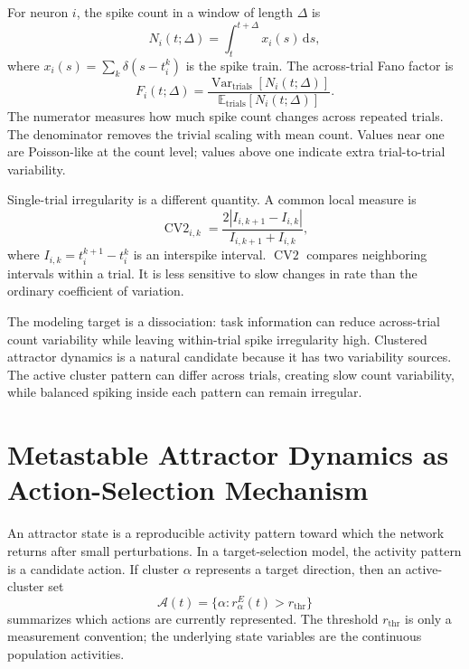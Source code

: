 For neuron $i$, the spike count in a window of length $\Delta$ is
%
\begin{equation}
  N_i(t;\Delta)
  =
  \int_t^{t+\Delta} x_i(s)\,\mathrm{d}s,
  \label{eq:spike-count-window-ch13}
\end{equation}
%
where $x_i(s)=\sum_k\delta(s-t_i^k)$ is the spike train. The across-trial Fano factor is
%
\begin{equation}
  F_i(t;\Delta)
  =
  \frac{\operatorname{Var}_{\mathrm{trials}}[N_i(t;\Delta)]}
       {\mathbb{E}_{\mathrm{trials}}[N_i(t;\Delta)]}.
  \label{eq:fano-factor-ch13}
\end{equation}
%
The numerator measures how much spike count changes across repeated trials. The denominator removes the trivial scaling with mean count. Values near one are Poisson-like at the count level; values above one indicate extra trial-to-trial variability.

Single-trial irregularity is a different quantity. A common local measure is
%
\begin{equation}
  \operatorname{CV2}_{i,k}
  =
  \frac{2|I_{i,k+1}-I_{i,k}|}{I_{i,k+1}+I_{i,k}},
  \label{eq:cv2-ch13}
\end{equation}
%
where $I_{i,k}=t_i^{k+1}-t_i^k$ is an interspike interval. $\operatorname{CV2}$ compares neighboring intervals within a trial. It is less sensitive to slow changes in rate than the ordinary coefficient of variation.

The modeling target is a dissociation: task information can reduce across-trial count variability while leaving within-trial spike irregularity high. Clustered attractor dynamics is a natural candidate because it has two variability sources. The active cluster pattern can differ across trials, creating slow count variability, while balanced spiking inside each pattern can remain irregular.

\section{Metastable Attractor Dynamics as Action-Selection Mechanism}
\label{sec:metastable-attractor-action-selection}

An attractor state is a reproducible activity pattern toward which the network returns after small perturbations. In a target-selection model, the activity pattern is a candidate action. If cluster $\alpha$ represents a target direction, then an active-cluster set
%
\begin{equation}
  \mathcal{A}(t)
  =
  \{\alpha:r_{\alpha}^{E}(t)>r_{\mathrm{thr}}\}
  \label{eq:active-cluster-set-ch13}
\end{equation}
%
summarizes which actions are currently represented. The threshold $r_{\mathrm{thr}}$ is only a measurement convention; the underlying state variables are the continuous population activities.

